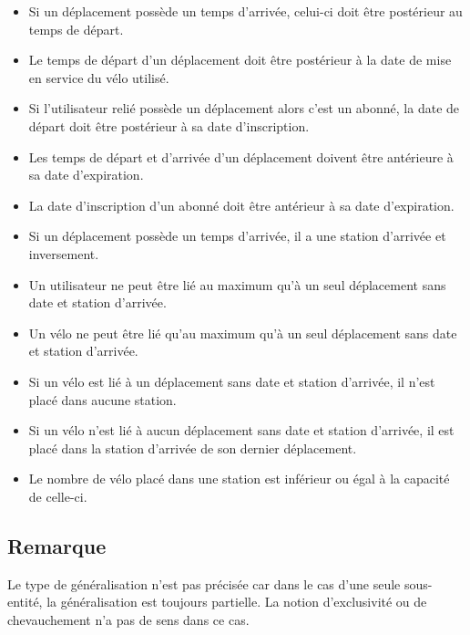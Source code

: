 \documentclass[a4paper, 12pt]{report}
\begin{document}
	\begin{itemize}
		\item Si un déplacement possède un temps d’arrivée, celui-ci doit être postérieur au temps de départ.
		
		\item Le temps de départ d’un déplacement doit être postérieur à la date de mise en service du vélo utilisé.
		
		\item Si l’utilisateur relié possède un déplacement alors c'est un abonné, la date de départ doit être postérieur à sa date d’inscription.
		
		\item Les temps de départ et d’arrivée d’un déplacement doivent être antérieure à sa date d’expiration.
		
		\item La date d’inscription d’un abonné doit être antérieur à sa date d’expiration.
		
		\item Si un déplacement possède un temps d’arrivée, il a une station d’arrivée et inversement.
		
		\item Un utilisateur ne peut être lié au maximum qu’à un seul déplacement sans date et station d’arrivée.
		
		\item Un vélo ne peut être lié qu'au maximum qu'à un seul déplacement sans date et station d’arrivée.
		
		\item Si un vélo est lié à un déplacement sans date et station d’arrivée, il n’est placé dans aucune station.
		
		\item Si un vélo n’est lié à aucun déplacement sans date et station d’arrivée, il est placé dans la station d’arrivée de son dernier déplacement.
		
		\item Le nombre de vélo placé dans une station est inférieur ou égal à la capacité de celle-ci.
		
	\end{itemize}
	
	\subsection*{Remarque}
		Le type de généralisation n’est pas précisée car dans le cas d’une seule sous-entité, la généralisation est toujours partielle. La notion d’exclusivité ou de chevauchement n’a pas de sens dans ce cas.
\end{document}
